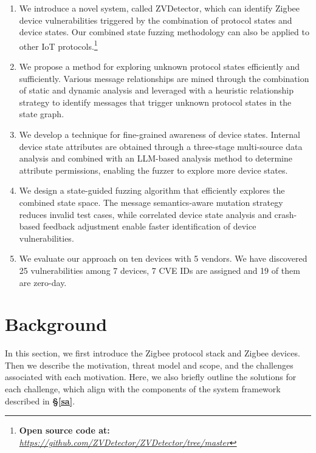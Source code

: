 \documentclass[10pt,journal,compsoc]{IEEEtran}
\begin{document}
\begin{enumerate}[$\bullet$]
    \setlength{\itemsep}{3pt}
    \item We introduce a novel system, called ZVDetector, which can identify Zigbee device vulnerabilities triggered by the combination of protocol states and device states. Our combined state fuzzing methodology can also be applied to other IoT protocols.\footnote[1]{\textbf{Open source code at:} \textit{\url{https://github.com/ZVDetector/ZVDetector/tree/master}}}

    \item We propose a method for exploring unknown protocol states efficiently and sufficiently. Various message relationships are mined through the combination of static and dynamic analysis and leveraged with a heuristic relationship strategy to identify messages that trigger unknown protocol states in the state graph.
    
    \item We develop a technique for fine-grained awareness of device states. Internal device state attributes are obtained through a three-stage multi-source data analysis and combined with an LLM-based analysis method to determine attribute permissions, enabling the fuzzer to explore more device states.

    \item We design a state-guided fuzzing algorithm that efficiently explores the combined state space. The message semantics-aware mutation strategy reduces invalid test cases, while correlated device state analysis and crash-based feedback adjustment enable faster identification of device vulnerabilities.
    
    \item We evaluate our approach on ten devices with 5 vendors. We have discovered 25 vulnerabilities among 7 devices, 7 CVE IDs are assigned and 19 of them are zero-day. 
    
\end{enumerate}


\section{Background} \label{Background}
In this section, we first introduce the Zigbee protocol stack and Zigbee devices. Then we describe the motivation, threat model and scope, and the challenges associated with each motivation. Here, we also briefly outline the solutions for each challenge, which align with the components of the system framework described in \textbf{\S\ref{sa}}.
\end{document}
